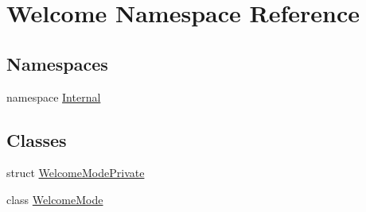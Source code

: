\hypertarget{namespace_welcome}{\section{Welcome Namespace Reference}
\label{namespace_welcome}
}
\subsection*{Namespaces}
\begin{DoxyCompactItemize}
\item 
namespace \hyperlink{namespace_welcome_1_1_internal}{Internal}
\end{DoxyCompactItemize}
\subsection*{Classes}
\begin{DoxyCompactItemize}
\item 
struct \hyperlink{struct_welcome_1_1_welcome_mode_private}{Welcome\-Mode\-Private}
\item 
class \hyperlink{class_welcome_1_1_welcome_mode}{Welcome\-Mode}
\end{DoxyCompactItemize}
